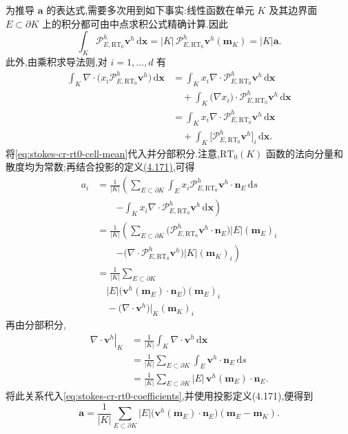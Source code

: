\begin{example}
为推导 $\bm{a}$ 的表达式,需要多次用到如下事实:线性函数在单元 $K$ 及其边界面 $E\subset\partial K$ 上的积分都可由中点求积公式精确计算.因此
\begin{equation}\label{eq:stokes-cr-rt0-cell-mean}
  \int_K\mathcal{P}_{E,\mathrm{RT}_0}^h\bm{v}^h\,\mathrm{d}\bm{x}
  =|K|\,\mathcal{P}_{E,\mathrm{RT}_0}^h\bm{v}^h(\bm{m}_K)
  =|K|\bm{a}.
\end{equation}
此外,由乘积求导法则,对 $i=1,\ldots,d$ 有
\[
\begin{aligned}
  \int_K\nabla\cdot\bigl(x_i\mathcal{P}_{E,\mathrm{RT}_0}^h\bm{v}^h\bigr)\,\mathrm{d}\bm{x}
  &=\int_K x_i\nabla\cdot\mathcal{P}_{E,\mathrm{RT}_0}^h\bm{v}^h\,\mathrm{d}\bm{x}\\
  &\quad+\int_K\bigl(\nabla x_i\bigr)\cdot\mathcal{P}_{E,\mathrm{RT}_0}^h\bm{v}^h\,\mathrm{d}\bm{x}\\
  &=\int_K x_i\nabla\cdot\mathcal{P}_{E,\mathrm{RT}_0}^h\bm{v}^h\,\mathrm{d}\bm{x}\\
  &\quad+\int_K\bigl[\mathcal{P}_{E,\mathrm{RT}_0}^h\bm{v}^h\bigr]_i\,\mathrm{d}\bm{x}.
\end{aligned}
\]
将\cref{eq:stokes-cr-rt0-cell-mean}代入并分部积分.注意,$\mathrm{RT}_0(K)$ 函数的法向分量和散度均为常数;再结合投影的定义\hyperref[eq:stokes-cr-rt0-projection]{(4.171)},可得
\begin{equation}\label{eq:stokes-cr-rt0-coefficients}
\begin{aligned}
  a_i
  &=\frac{1}{|K|}\left(
    \sum_{E\subset\partial K}\int_E
      x_i\mathcal{P}_{E,\mathrm{RT}_0}^h\bm{v}^h\cdot\bm{n}_E\,\mathrm{d}s
    \right.\\
  &\qquad\left.
    -\int_K x_i\nabla\cdot\mathcal{P}_{E,\mathrm{RT}_0}^h\bm{v}^h\,\mathrm{d}\bm{x}
    \right)\\
  &=\frac{1}{|K|}\left(
    \sum_{E\subset\partial K}
      \bigl(\mathcal{P}_{E,\mathrm{RT}_0}^h\bm{v}^h\cdot\bm{n}_E\bigr)|E|(\bm{m}_E)_i
    \right.\\
  &\qquad\left.
    -\bigl(\nabla\cdot\mathcal{P}_{E,\mathrm{RT}_0}^h\bm{v}^h\bigr)|K|(\bm{m}_K)_i
    \right)\\
  &=\frac{1}{|K|}\sum_{E\subset\partial K}\\
  &\quad |E|\bigl(\bm{v}^h(\bm{m}_E)\cdot\bm{n}_E\bigr)(\bm{m}_E)_i\\
  &\quad-\bigl(\nabla\cdot\bm{v}^h\bigr)|_K(\bm{m}_K)_i
\end{aligned}
\end{equation}
再由分部积分,
\[
\begin{aligned}
  \left.\nabla\cdot\bm{v}^h\right|_K
  &=\frac{1}{|K|}\int_K\nabla\cdot\bm{v}^h\,\mathrm{d}\bm{x}\\
  &=\frac{1}{|K|}\sum_{E\subset\partial K}\int_E\bm{v}^h\cdot\bm{n}_E\,\mathrm{d}s\\
  &=\frac{1}{|K|}\sum_{E\subset\partial K}|E|\,\bm{v}^h(\bm{m}_E)\cdot\bm{n}_E.
\end{aligned}
\]
将此关系代入\cref{eq:stokes-cr-rt0-coefficients},并使用投影定义(4.171),便得到
\[
  \bm{a}
  =\frac{1}{|K|}\sum_{E\subset\partial K}
    |E|\bigl(\bm{v}^h(\bm{m}_E)\cdot\bm{n}_E\bigr)(\bm{m}_E-\bm{m}_K).
\]


\end{example}
